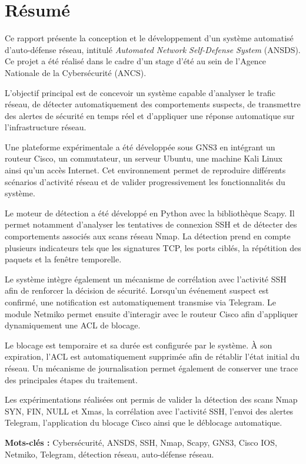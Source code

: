 \chapter*{Résumé}

Ce rapport présente la conception et le développement d’un système automatisé
d’auto-défense réseau, intitulé \textit{Automated Network Self-Defense System}
(ANSDS). Ce projet a été réalisé dans le cadre d’un stage d’été au sein de
l’Agence Nationale de la Cybersécurité (ANCS).

L’objectif principal est de concevoir un système capable d’analyser le trafic
réseau, de détecter automatiquement des comportements suspects, de transmettre
des alertes de sécurité en temps réel et d’appliquer une réponse automatique
sur l’infrastructure réseau.

Une plateforme expérimentale a été développée sous GNS3 en intégrant un routeur
Cisco, un commutateur, un serveur Ubuntu, une machine Kali Linux ainsi qu’un
accès Internet. Cet environnement permet de reproduire différents scénarios
d’activité réseau et de valider progressivement les fonctionnalités du système.

Le moteur de détection a été développé en Python avec la bibliothèque Scapy.
Il permet notamment d’analyser les tentatives de connexion SSH et de détecter
des comportements associés aux scans réseau Nmap. La détection prend en compte
plusieurs indicateurs tels que les signatures TCP, les ports ciblés, la
répétition des paquets et la fenêtre temporelle.

Le système intègre également un mécanisme de corrélation avec l’activité SSH
afin de renforcer la décision de sécurité. Lorsqu’un événement suspect est
confirmé, une notification est automatiquement transmise via Telegram.
Le module Netmiko permet ensuite d’interagir avec le routeur Cisco afin
d’appliquer dynamiquement une ACL de blocage.

Le blocage est temporaire et sa durée est configurée par le système.
À son expiration, l’ACL est automatiquement supprimée afin de rétablir l’état
initial du réseau. Un mécanisme de journalisation permet également de conserver
une trace des principales étapes du traitement.

Les expérimentations réalisées ont permis de valider la détection des scans
Nmap SYN, FIN, NULL et Xmas, la corrélation avec l’activité SSH, l’envoi des
alertes Telegram, l’application du blocage Cisco ainsi que le déblocage
automatique.

\textbf{Mots-clés :} Cybersécurité, ANSDS, SSH, Nmap, Scapy, GNS3, Cisco IOS,
Netmiko, Telegram, détection réseau, auto-défense réseau.